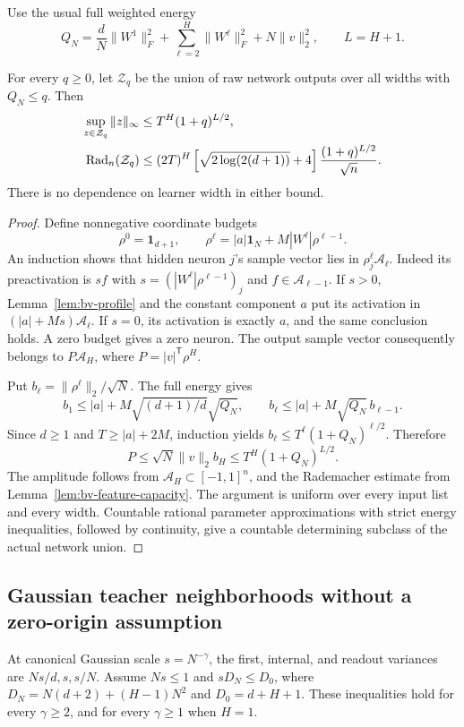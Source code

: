 Use the usual full weighted energy
\[
 Q_N=\frac dN\|W^1\|_F^2+\sum_{\ell=2}^H\|W^\ell\|_F^2+N\|v\|_2^2,
 \qquad L=H+1.
\]
\begin{theorem}
\label{thm:bv-capacity}
For every $q\ge0$, let $\mathcal Z_q$ be the union of raw network outputs over all widths with $Q_N\le q$. Then
\begin{align}
 \sup_{z\in\mathcal Z_q}\|z\|_\infty
 &\le T^H(1+q)^{L/2},\notag\\
 \operatorname{Rad}_n(\mathcal Z_q)
 &\le(2T)^H\left[\sqrt{2\log(2(d+1))}+4\right]
       \frac{(1+q)^{L/2}}{\sqrt n}.
 \label{eq:bv-capacity}
\end{align}
There is no dependence on learner width in either bound.
\end{theorem}
\begin{proof}
Define nonnegative coordinate budgets
\[
 \rho^0=\mathbf1_{d+1},\qquad
 \rho^\ell=|a|\mathbf1_N+M|W^\ell|\rho^{\ell-1}.
\]
An induction shows that hidden neuron $j$'s sample vector lies in $\rho_j^\ell\mathcal A_\ell$. Indeed its preactivation is $s f$ with $s=(|W^\ell|\rho^{\ell-1})_j$ and $f\in\mathcal A_{\ell-1}$. If $s>0$, Lemma~\ref{lem:bv-profile} and the constant component $a$ put its activation in $(|a|+Ms)\mathcal A_\ell$. If $s=0$, its activation is exactly $a$, and the same conclusion holds. A zero budget gives a zero neuron. The output sample vector consequently belongs to $P\mathcal A_H$, where $P=|v|^{\mathsf T}\rho^H$.

Put $b_\ell=\|\rho^\ell\|_2/\sqrt N$. The full energy gives
\[
 b_1\le|a|+M\sqrt{(d+1)/d}\sqrt{Q_N},\qquad
 b_\ell\le|a|+M\sqrt{Q_N}\,b_{\ell-1}.
\]
Since $d\ge1$ and $T\ge|a|+2M$, induction yields
$b_\ell\le T^\ell(1+Q_N)^{\ell/2}$. Therefore
\[
 P\le\sqrt N\|v\|_2 b_H
 \le T^H(1+Q_N)^{L/2}.
\]
The amplitude follows from $\mathcal A_H\subset[-1,1]^n$, and the Rademacher estimate from Lemma~\ref{lem:bv-feature-capacity}. The argument is uniform over every input list and every width. Countable rational parameter approximations with strict energy inequalities, followed by continuity, give a countable determining subclass of the actual network union.
\end{proof}

\subsection{Gaussian teacher neighborhoods without a zero-origin assumption}
At canonical Gaussian scale $s=N^{-\gamma}$, the first, internal, and readout variances are $Ns/d,s,s/N$. Assume $Ns\le1$ and $sD_N\le D_0$, where $D_N=N(d+2)+(H-1)N^2$ and $D_0=d+H+1$. These inequalities hold for every $\gamma\ge2$, and for every $\gamma\ge1$ when $H=1$.

